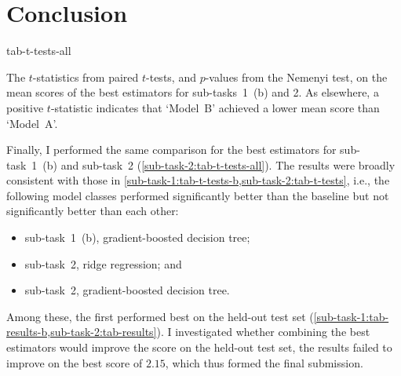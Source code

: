 \section{Conclusion}
\label{sec:conclusion}

\begin{table}
  \centering
  {tab-t-tests-all}
  \caption{
    The $t$-statistics from paired $t$-tests, and $p$-values from the Nemenyi test, on
    the mean scores of the best estimators for sub-tasks~1~(b) and 2.
    As elsewhere, a positive $t$-statistic indicates that `Model~B' achieved a lower mean
    score than `Model~A'.
  }
  \label{sub-task-2:tab-t-tests-all}
\end{table}

Finally, I performed the same comparison for the best estimators for sub-task~1~(b) and
sub-task~2 (\cref{sub-task-2:tab-t-tests-all}).
The results were broadly consistent with those in
\cref{sub-task-1:tab-t-tests-b,sub-task-2:tab-t-tests}, i.e., the following model classes
performed significantly better than the baseline but not significantly better than
each other:
\begin{itemize}
  \item sub-task~1~(b), gradient-boosted decision tree;
  \item sub-task~2, ridge regression; and
  \item sub-task~2, gradient-boosted decision tree.
\end{itemize}
Among these, the first performed best on the held-out test set
(\cref{sub-task-1:tab-results-b,sub-task-2:tab-results}).
I investigated whether combining the best estimators would improve the score on the
held-out test set, the results failed to improve on the best score of $2.15$, which
thus formed the final submission.
